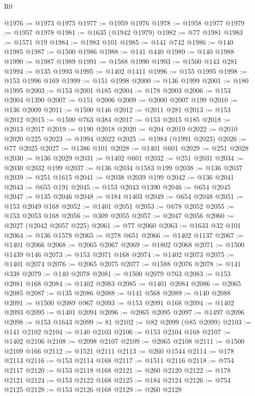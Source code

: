 \begin{lexlean}{R0}
\begin{coremodule}
@1976 := @1973 @1975
@1977 := @1959 @1976
@1978 := @1958 @1977
@1979 := @1957 @1978
@1981 := @1635 (@1942 @1979)
@1982 := @77 @1981
@1983 := @1571 @19
@1984 := @1983 @101
@1985 := @141 @742
@1986 := @140 @1985
@1987 := @1500 @1986
@1988 := @141 @440
@1989 := @140 @1988
@1990 := @1987 @1989
@1991 := @1588 @1990
@1993 := @1500 @143 @281
@1994 := @135 @1993
@1995 := @1402 @1411
@1996 := @155 @1995
@1998 := @153 @1996 @169
@1999 := @151 @1998
@2000 := @136 @1999
@2001 := @180 @1995
@2003 := @153 @2001 @185
@2004 := @178 @2003
@2006 := @153 @2004 @1390
@2007 := @151 @2006
@2009 := @2000 @2007 @199
@2010 := @136 @2009
@2011 := @1500 @146
@2012 := @2011 @281
@2013 := @153 @2012
@2015 := @1500 @763 @384
@2017 := @153 @2015 @185
@2018 := @2013 @2017
@2019 := @190 @2018
@2020 := @204 @2019
@2022 := @2010 @2020 @225
@2023 := @1994 @2022
@2025 := @1984 (@1991 @2023)
@2026 := @77 @2025
@2027 := @1386 @101
@2028 := @1401 @601
@2029 := @251 @2028
@2030 := @136 @2029
@2031 := @1402 @601
@2032 := @251 @2031
@2034 := @2030 @2032 @199
@2037 := @136 @2034 @1583 @199
@2038 := @136 @2037
@2039 := @251 @1615
@2041 := @2038 @2039 @199
@2042 := @136 @2041
@2043 := @655 @191
@2045 := @153 @2043 @1390
@2046 := @654 @2045
@2047 := @135 @2046
@2048 := @184 @1403
@2049 := @654 @2048
@2051 := @153 @2049 @168
@2052 := @1401 @2051
@2053 := @678 @2052
@2055 := @153 @2053 @168
@2056 := @309 @2055
@2057 := @2047 @2056
@2060 := @2027 (@2042 @2057 @225)
@2061 := @77 @2060
@2063 := @1633 @32 @101
@2064 := @136 @1578
@2065 := @278 @651
@2066 := @1402 @1137
@2067 := @1401 @2066
@2068 := @2065 @2067
@2069 := @1802 @2068
@2071 := @1500 @1439 @146
@2073 := @153 @2071 @168
@2074 := @1402 @2073
@2075 := @1401 @2074
@2076 := @2065 @2075
@2077 := @1588 @2076
@2078 := @141 @338
@2079 := @140 @2078
@2081 := @1500 @2079 @763
@2083 := @153 @2081 @168
@2084 := @1402 @2083
@2085 := @1401 @2084
@2086 := @2065 @2085
@2087 := @135 @2086
@2088 := @141 @568
@2089 := @140 @2088
@2091 := @1500 @2089 @967
@2093 := @153 @2091 @168
@2094 := @1402 @2093
@2095 := @1401 @2094
@2096 := @2065 @2095
@2097 := @1497 @2096
@2098 := @153 @1643
@2099 := 81
@2102 := @82 @2099 (@85 @2099)
@2103 := @141 @2102
@2104 := @140 @2103
@2106 := @153 @2104 @168
@2107 := @1402 @2106
@2108 := @2098 @2107
@2109 := @2065 @2108
@2111 := @1500 @2109 @166
@2112 := @1521 @2111
@2113 := @260 @1544
@2114 := @178 @2113
@2116 := @153 @2114 @168
@2117 := @1511 @2116
@2118 := @754 @2117
@2120 := @153 @2118 @168
@2121 := @260 @2120
@2122 := @178 @2121
@2124 := @153 @2122 @168
@2125 := @184 @2124
@2126 := @754 @2125
@2128 := @153 @2126 @168
@2129 := @260 @2128

\end{coremodule}
\end{lexlean}
